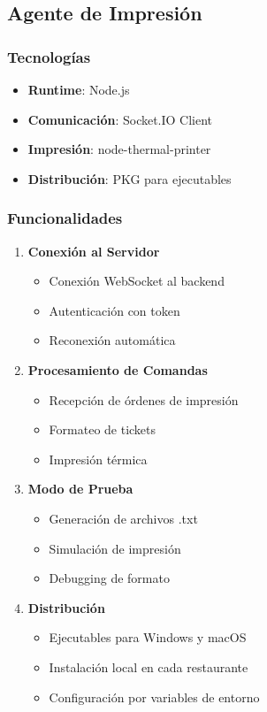 \documentclass[12pt,a4paper]{article}
\begin{document}
\subsection{Agente de Impresión}

\subsubsection{Tecnologías}
\begin{itemize}
    \item \textbf{Runtime}: Node.js
    \item \textbf{Comunicación}: Socket.IO Client
    \item \textbf{Impresión}: node-thermal-printer
    \item \textbf{Distribución}: PKG para ejecutables
\end{itemize}

\subsubsection{Funcionalidades}
\begin{enumerate}
    \item \textbf{Conexión al Servidor}
    \begin{itemize}
        \item Conexión WebSocket al backend
        \item Autenticación con token
        \item Reconexión automática
    \end{itemize}
    
    \item \textbf{Procesamiento de Comandas}
    \begin{itemize}
        \item Recepción de órdenes de impresión
        \item Formateo de tickets
        \item Impresión térmica
    \end{itemize}
    
    \item \textbf{Modo de Prueba}
    \begin{itemize}
        \item Generación de archivos .txt
        \item Simulación de impresión
        \item Debugging de formato
    \end{itemize}
    
    \item \textbf{Distribución}
    \begin{itemize}
        \item Ejecutables para Windows y macOS
        \item Instalación local en cada restaurante
        \item Configuración por variables de entorno
    \end{itemize}
\end{enumerate}
\end{document}
